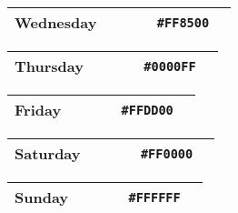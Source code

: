 \begin{table}[!htbp]
	\begin{tabularx}{\textwidth}{X r c r c}
		Wednesday 
		& ~ & ~
		& \texttt{\#FF8500} & \cellcolor[HTML]{FF8500}\phantom{--} \\ \hline
	\end{tabularx}
\end{table}

\begin{table}[!htbp]
	\begin{tabularx}{\textwidth}{X r c r c}
		Thursday 
		& ~ & ~
		& \texttt{\#0000FF} & \cellcolor[HTML]{0000FF}\phantom{--} \\ \hline
	\end{tabularx}
\end{table}

\begin{table}[!htbp]
	\begin{tabularx}{\textwidth}{X r c r c}
		Friday 
		& ~ & ~
		& \texttt{\#FFDD00} & \cellcolor[HTML]{FFDD00}\phantom{--} \\ \hline
	\end{tabularx}
\end{table}

\begin{table}[!htbp]
	\begin{tabularx}{\textwidth}{X r c r c}
		Saturday 
		& ~ & ~
		& \texttt{\#FF0000} & \cellcolor[HTML]{FF0000}\phantom{--} \\ \hline
	\end{tabularx}
\end{table}

\begin{table}[!htbp]
	\begin{tabularx}{\textwidth}{X r c r c}
		Sunday 
		& ~ & ~
		& \texttt{\#FFFFFF} & \cellcolor[HTML]{FFFFFF}\phantom{--} \\ \hline
	\end{tabularx}
\end{table}